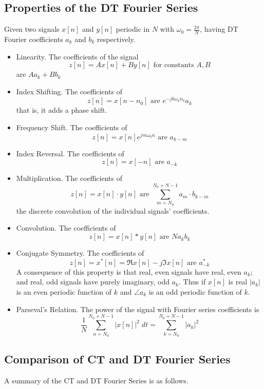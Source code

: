 \subsection{Properties of the DT Fourier Series}

Given two signals $x[n]$ and $y[n]$ periodic in $N$ with $\omega_0 = \frac{2\pi}{N}$, having DT Fourier coefficients
$a_k$ and $b_k$ respectively.

\begin{itemize}
\item Linearity. The coefficients of the signal
  \[
  z[n] = Ax[n] + By[n] \mbox{ for constants } A,B 
  \]
  are $Aa_k + Bb_k$
\item Index Shifting. The coefficients of
  \[
  z[n] = x[n-n_0] \mbox{ are } e^{-jk\omega_0 n_0}a_k
  \]
  that is, it adds a phase shift.
\item Frequency Shift. The coefficients of
  \[
  z[n] = x[n]e^{jm\omega_0n} \mbox{ are } a_{k-m}
  \]
\item Index Reversal. The coefficients of
  \[
  z[n] = x[-n] \mbox{ are } a_{-k}
  \]
\item Multiplication. The coefficients of
  \[
  z[n] = x[n] \cdot y[n] \mbox{ are } \sum\limits_{m = N_0}^{N_0 + N -1} a_m\cdot b_{k-m}
  \]
  the discrete convolution of the individual signals' coefficients.
\item Convolution. The coefficients of
  \[
  z[n] = x[n] * y[n] \mbox{ are } N a_k b_k
  \] 
\item Conjugate Symmetry. The coefficients of
  \[
  z[n] = x^*[n] = \Re{x[n]} - j\Im{x[n]} \mbox{ are } a_{-k}^*
  \]
  A consequence of this property is that real, even signals have real, even $a_k$; and real, odd signals have purely imaginary, odd  $a_k$. Thus if $x[n]$ is real  $|a_k|$ is an even periodic function of $k$ and $\angle a_k$ is an odd periodic function of $k$. 
\item Parseval's Relation. The power of the signal with Fourier series coefficients is
  \[
  \frac{1}{N} \sum\limits_{n = N_0}^{N_0 + N -1} |x[n]|^2\;dt = \sum\limits_{k = N_0}^{N_0+N-1} |a_k|^2
  \]
\end{itemize}


\subsection{Comparison of CT and DT Fourier Series}
A summary of the CT and DT Fourier Series is as follows.\\

